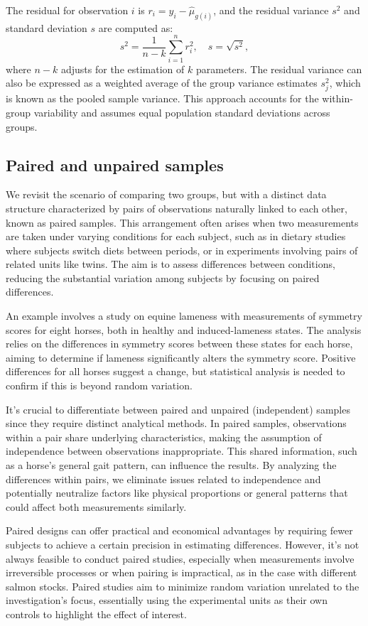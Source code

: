 \documentclass{article}
\begin{document}
The residual for observation $i$ is $r_i = y_i - \hat{\mu}_{g(i)}$, and the residual variance $s^2$ and standard deviation $s$ are computed as:
\[
s^2 = \frac{1}{n - k} \sum_{i=1}^{n} r_i^2, \quad s = \sqrt{s^2},
\]
where $n - k$ adjusts for the estimation of $k$ parameters. The residual variance can also be expressed as a weighted average of the group variance estimates $s_j^2$, which is known as the pooled sample variance. This approach accounts for the within-group variability and assumes equal population standard deviations across groups.

\subsection{Paired and unpaired samples}
We revisit the scenario of comparing two groups, but with a distinct data structure characterized by pairs of observations naturally linked to each other, known as paired samples. This arrangement often arises when two measurements are taken under varying conditions for each subject, such as in dietary studies where subjects switch diets between periods, or in experiments involving pairs of related units like twins. The aim is to assess differences between conditions, reducing the substantial variation among subjects by focusing on paired differences.

An example involves a study on equine lameness with measurements of symmetry scores for eight horses, both in healthy and induced-lameness states. The analysis relies on the differences in symmetry scores between these states for each horse, aiming to determine if lameness significantly alters the symmetry score. Positive differences for all horses suggest a change, but statistical analysis is needed to confirm if this is beyond random variation.

It's crucial to differentiate between paired and unpaired (independent) samples since they require distinct analytical methods. In paired samples, observations within a pair share underlying characteristics, making the assumption of independence between observations inappropriate. This shared information, such as a horse's general gait pattern, can influence the results. By analyzing the differences within pairs, we eliminate issues related to independence and potentially neutralize factors like physical proportions or general patterns that could affect both measurements similarly.

Paired designs can offer practical and economical advantages by requiring fewer subjects to achieve a certain precision in estimating differences. However, it's not always feasible to conduct paired studies, especially when measurements involve irreversible processes or when pairing is impractical, as in the case with different salmon stocks. Paired studies aim to minimize random variation unrelated to the investigation's focus, essentially using the experimental units as their own controls to highlight the effect of interest.
\end{document}
